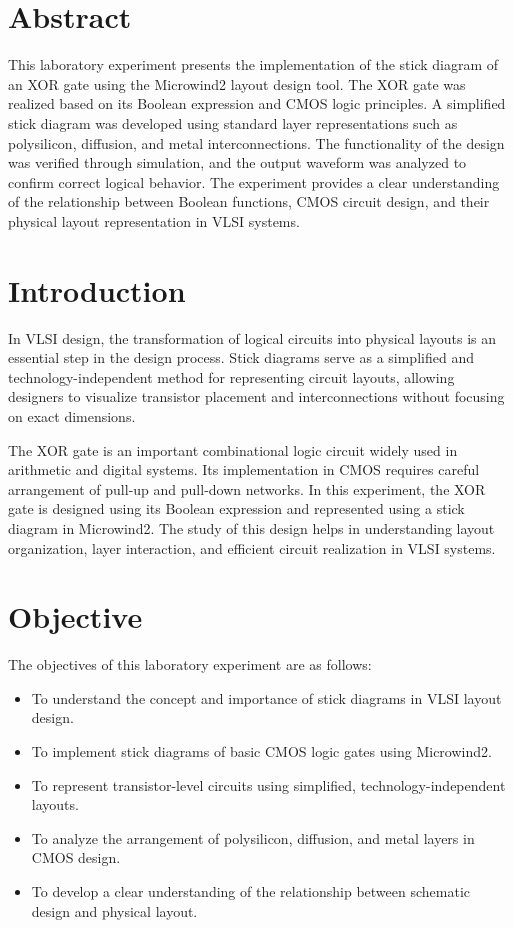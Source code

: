 \documentclass[12pt,a4paper]{article}
\begin{document}
\tableofcontents
\thispagestyle{empty}
\clearpage
{}

\section*{\center Abstract}
This laboratory experiment presents the implementation of the stick diagram of an XOR gate using the Microwind2 layout design tool. The XOR gate was realized based on its Boolean expression and CMOS logic principles. A simplified stick diagram was developed using standard layer representations such as polysilicon, diffusion, and metal interconnections. The functionality of the design was verified through simulation, and the output waveform was analyzed to confirm correct logical behavior. The experiment provides a clear understanding of the relationship between Boolean functions, CMOS circuit design, and their physical layout representation in VLSI systems.




\section{Introduction}
In VLSI design, the transformation of logical circuits into physical layouts is an essential step in the design process. Stick diagrams serve as a simplified and technology-independent method for representing circuit layouts, allowing designers to visualize transistor placement and interconnections without focusing on exact dimensions.

The XOR gate is an important combinational logic circuit widely used in arithmetic and digital systems. Its implementation in CMOS requires careful arrangement of pull-up and pull-down networks. In this experiment, the XOR gate is designed using its Boolean expression and represented using a stick diagram in Microwind2. The study of this design helps in understanding layout organization, layer interaction, and efficient circuit realization in VLSI systems.



\section{Objective}
The objectives of this laboratory experiment are as follows:
\begin{itemize}
    \item To understand the concept and importance of stick diagrams in VLSI layout design.
    \item To implement stick diagrams of basic CMOS logic gates using Microwind2.
    \item To represent transistor-level circuits using simplified, technology-independent layouts.
    \item To analyze the arrangement of polysilicon, diffusion, and metal layers in CMOS design.
    \item To develop a clear understanding of the relationship between schematic design and physical layout.
\end{itemize}
\end{document}
